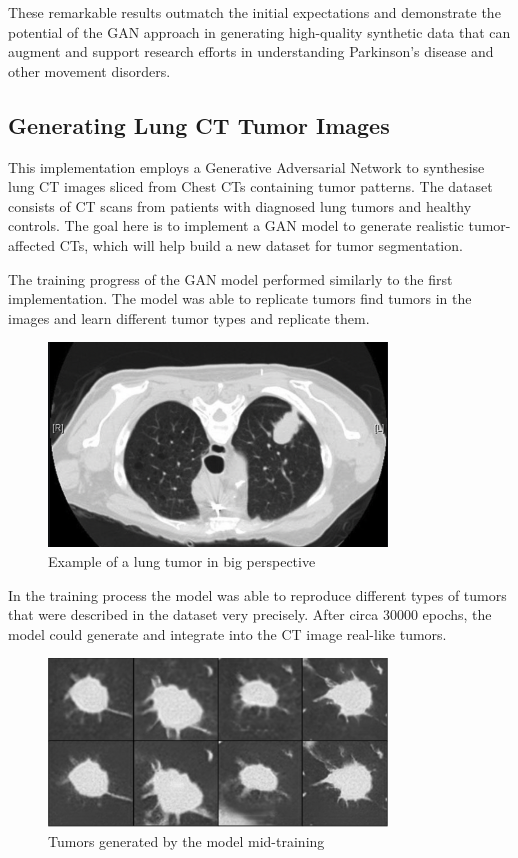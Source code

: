 \documentclass[12pt]{article}
\begin{document}
These remarkable results outmatch the initial expectations and demonstrate the potential of the GAN approach in generating high-quality synthetic data that can augment and support
research efforts in understanding Parkinson’s disease and other movement disorders.

\subsection{Generating Lung CT Tumor Images}
This implementation employs a Generative Adversarial Network to synthesise lung CT images sliced from Chest CTs containing tumor patterns. The dataset consists of CT scans from patients with diagnosed lung tumors and healthy controls. The goal here is to implement a GAN model to generate realistic tumor-affected CTs, which will help build a new dataset for tumor segmentation.

The training progress of the GAN model performed similarly to the first implementation. The model was able to replicate tumors find tumors in the images and learn different tumor types and replicate them.

\begin{figure}[h]
\includegraphics[width=9cm]{tumorReplicated.png}
\centering
\caption{Example of a lung tumor in big perspective}
\end{figure}

In the training process the model was able to reproduce different types of tumors that were described in the dataset very precisely. After circa 30000 epochs, the model could generate and integrate into the CT image real-like tumors.

\begin{figure}[h]
\includegraphics[width=9cm]{generatedTumorsSet1.png}
\centering
\caption{Tumors generated by the model mid-training}
\end{figure}
\end{document}
